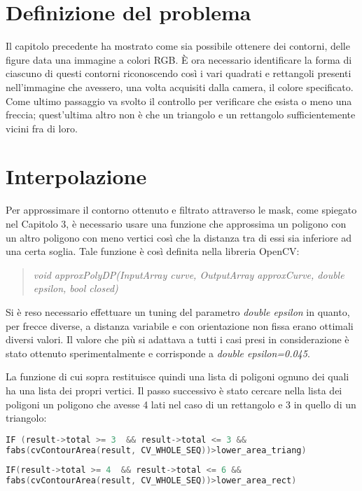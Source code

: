\section{Definizione del problema}
Il capitolo precedente ha mostrato come sia possibile ottenere dei contorni, delle figure data una immagine a colori RGB.
È ora necessario identificare la forma di ciascuno di questi contorni riconoscendo così i vari quadrati e rettangoli presenti nell'immagine che avessero, una volta acquisiti dalla camera, il colore specificato. Come ultimo passaggio va svolto il controllo per verificare che esista o meno una freccia; quest'ultima altro non è che un triangolo e un rettangolo sufficientemente vicini fra di loro.

\section{Interpolazione}
Per approssimare il contorno ottenuto e filtrato attraverso le mask, come spiegato nel Capitolo 3, è necessario usare una funzione che approssima un poligono con un altro poligono con meno vertici così che la distanza tra di essi sia inferiore ad una certa soglia. Tale funzione è così definita nella libreria OpenCV:

\begin{quotation}
	\textsl{void approxPolyDP(InputArray curve, OutputArray approxCurve, double epsilon, bool closed)}
\end{quotation}

Si è reso necessario effettuare un tuning del parametro \textsl{double epsilon} in quanto, per frecce diverse, a distanza variabile e con orientazione non fissa erano ottimali diversi valori. Il valore che più si adattava a tutti i casi presi in considerazione è stato ottenuto sperimentalmente e corrisponde a \textsl{double epsilon=0.045}.

La funzione di cui sopra restituisce quindi una lista di poligoni ognuno dei quali ha una lista dei propri vertici.
Il passo successivo è stato cercare nella lista dei poligoni un poligono che avesse 4 lati nel caso di un rettangolo e 3 in quello di un triangolo:

\begin{lstlisting}[language=c]
IF (result->total >= 3  && result->total <= 3 && 
fabs(cvContourArea(result, CV_WHOLE_SEQ))>lower_area_triang)
\end{lstlisting}
\begin{lstlisting}[language=c]
IF(result->total >= 4  && result->total <= 6 && 
fabs(cvContourArea(result, CV_WHOLE_SEQ))>lower_area_rect)
\end{lstlisting}

